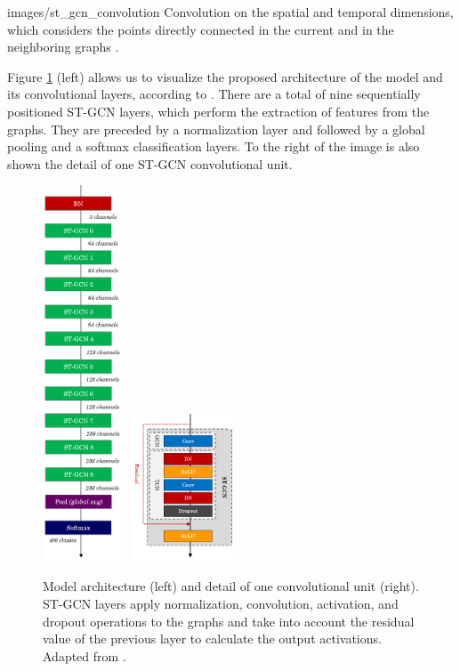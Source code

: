     {images/st_gcn_convolution}
    {Convolution on the spatial and temporal dimensions, which considers the points directly connected in the current and in the neighboring graphs \cite[p. 3]{st-gcn-2018}.}

Figure \ref{fig:st-gcn-architecture} (left) allows us to visualize the proposed architecture of the model and its convolutional layers, according to \cite{st-gcn-2018}. There are a total of nine sequentially positioned ST-GCN layers, which perform the extraction of features from the graphs. They are preceded by a normalization layer and followed by a global pooling and a softmax classification layers. To the right of the image is also shown the detail of one ST-GCN convolutional unit.

\begin{figure}[ht]
    \centering
    \includegraphics[width=2.5cm]{images/st_gcn_architecture}
    \includegraphics[width=3.0cm]{images/st_gcn_architeture_unit}
    \caption{Model architecture (left) and detail of one convolutional unit (right). ST-GCN layers apply normalization, convolution, activation, and dropout operations to the graphs and take into account the residual value of the previous layer to calculate the output activations. Adapted from \cite{st-gcn-2018}.}
    \label{fig:st-gcn-architecture}
\end{figure}

